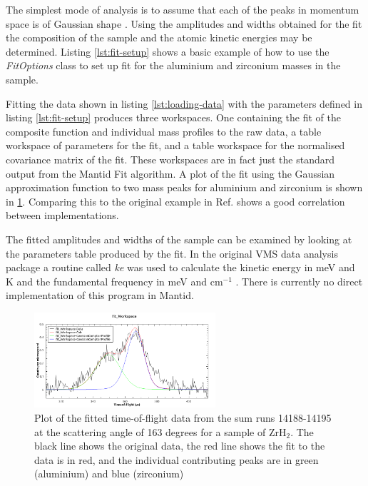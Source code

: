 \documentclass[paper=a4, fontsize=11pt]{scrartcl}	%
\numberwithin{equation}{section}															%
\numberwithin{figure}{section}																%
\numberwithin{table}{section}
\begin{document}
The simplest mode of analysis is to assume that each of the peaks in momentum space is of Gaussian shape \cite{mayers2004vesuvio}. Using the amplitudes and widths obtained for the fit the composition of the sample and the atomic kinetic energies may be determined. Listing \ref{lst:fit-setup} shows a basic example of how to use the \textit{FitOptions} class to set up fit for the aluminium and zirconium masses in the sample.

Fitting the data shown in listing \ref{lst:loading-data} with the parameters defined in listing \ref{lst:fit-setup} produces three workspaces. One containing the fit of the composite function and individual mass profiles to the raw data, a table workspace of parameters for the fit, and a table workspace for the normalised covariance matrix of the fit. These workspaces are in fact just the standard output from the Mantid Fit algorithm. A plot of the fit using the Gaussian approximation function to two mass peaks for aluminium and zirconium is shown in \ref{fig:gaussian-example-fit}. Comparing this to the original example in Ref. \cite{mayers2010user} shows a good correlation between implementations.

The fitted amplitudes and widths of the sample can be examined by looking at the parameters table produced by the fit. In the original VMS data analysis package a routine called \textit{ke} was used to calculate the kinetic energy in meV and K and the fundamental frequency in meV and cm$^{-1}$ \cite{mayers2010user}. There is currently no direct implementation of this program in Mantid.

\begin{figure}[H]
\centering
\includegraphics[width=0.6\textwidth]{img/gaussian-fit-example.png}
\caption{Plot of the fitted time-of-flight data from the sum runs 14188-14195 at the scattering angle of 163 degrees for a sample of ZrH$_2$. The black line shows the original data, the red line shows the fit to the data is in red, and the individual contributing peaks are in green (aluminium) and blue (zirconium)}
\label{fig:gaussian-example-fit}
\end{figure}
\end{document}
